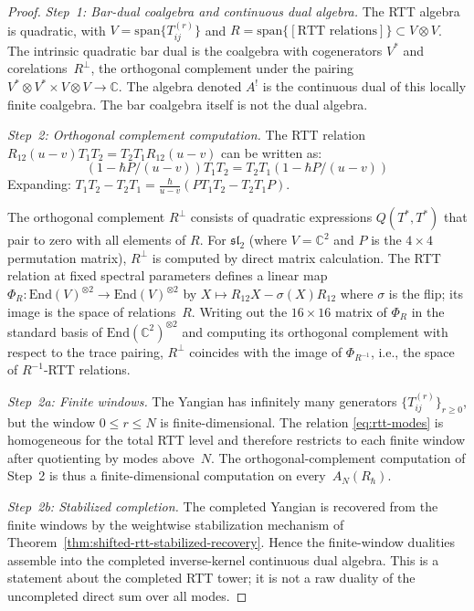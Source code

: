 \begin{proof}
\emph{Step~1: Bar-dual coalgebra and continuous dual algebra.}
The RTT algebra is quadratic, with
$V = \mathrm{span}\{T_{ij}^{(r)}\}$ and
$R = \mathrm{span}\{[\text{RTT relations}]\}
\subset V \otimes V$.
The intrinsic quadratic bar dual is the coalgebra with cogenerators
$V^*$ and corelations~$R^\perp$, the orthogonal complement
under the pairing
$V^* \otimes V^* \times V \otimes V \to \mathbb{C}$.
The algebra denoted $A^!$ is the continuous dual of this locally finite
coalgebra. The bar coalgebra itself is not the dual algebra.

\emph{Step~2: Orthogonal complement computation.}
The RTT relation $R_{12}(u-v) T_1 T_2 = T_2 T_1 R_{12}(u-v)$ can be written as:
\[
(1 - \hbar P/(u-v)) T_1 T_2 = T_2 T_1 (1 - \hbar P/(u-v))
\]
Expanding: $T_1 T_2 - T_2 T_1 = \frac{\hbar}{u-v}(P T_1 T_2 - T_2 T_1 P)$.

The orthogonal complement $R^\perp$ consists of quadratic expressions $Q(T^*, T^*)$ that pair to zero with all elements of $R$. For $\mathfrak{sl}_2$ (where $V = \mathbb{C}^2$ and $P$ is the $4 \times 4$ permutation matrix), $R^\perp$ is computed by direct matrix calculation. The RTT relation at fixed spectral parameters defines a linear map $\Phi_R\colon \mathrm{End}(V)^{\otimes 2} \to \mathrm{End}(V)^{\otimes 2}$ by $X \mapsto R_{12} X - \sigma(X) R_{12}$ where $\sigma$ is the flip; its image is the space of relations~$R$. Writing out the $16 \times 16$ matrix of $\Phi_R$ in the standard basis of $\mathrm{End}(\mathbb{C}^2)^{\otimes 2}$ and computing its orthogonal complement with respect to the trace pairing, $R^\perp$ coincides with the image of $\Phi_{R^{-1}}$, i.e., the space of $R^{-1}$-RTT relations.

\emph{Step~2a: Finite windows.}
The Yangian has infinitely many generators
$\{T_{ij}^{(r)}\}_{r\ge0}$, but the window
$0\le r\le N$ is finite-dimensional.  The relation
\eqref{eq:rtt-modes} is homogeneous for the total RTT level and
therefore restricts to each finite window after quotienting by modes
above~$N$.  The orthogonal-complement computation of Step~2 is thus
a finite-dimensional computation on every~$A_N(R_\hbar)$.

\emph{Step~2b: Stabilized completion.}
The completed Yangian is recovered from the finite windows by the
weightwise stabilization mechanism of
Theorem~\ref{thm:shifted-rtt-stabilized-recovery}.  Hence the
finite-window dualities assemble into the completed inverse-kernel
continuous dual algebra.  This is a statement about the completed RTT
tower; it is not a raw duality of the uncompleted direct sum over all
modes.


\end{proof}

